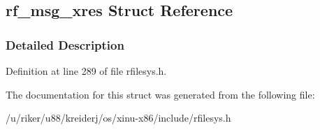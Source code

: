 \hypertarget{structrf__msg__xres}{}\subsection{rf\+\_\+msg\+\_\+xres Struct Reference}
\label{structrf__msg__xres}


\subsubsection{Detailed Description}


Definition at line 289 of file rfilesys.\+h.



The documentation for this struct was generated from the following file\+:\begin{DoxyCompactItemize}
\item 
/u/riker/u88/kreiderj/os/xinu-\/x86/include/rfilesys.\+h\end{DoxyCompactItemize}
